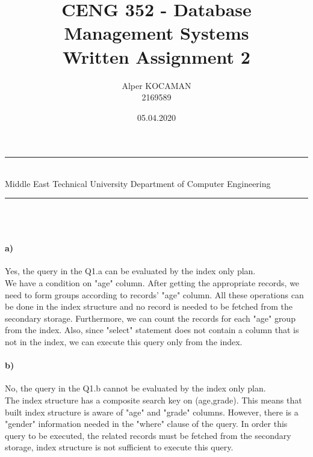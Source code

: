 \documentclass[a4paper,12pt]{article}
\title{CENG 352 - Database Management Systems \\ Written Assignment 2}
\author{Alper KOCAMAN \\ 2169589} %
\date{05.04.2020}
\newcommand{\HRule}{\rule{\linewidth}{1mm}}
\begin{document}
\HRule\\
Middle East Technical University \hfill Department of Computer Engineering
{\let\newpage\relax\maketitle}
\HRule\\
\vspace{1cm}


\section{ \hfill}

\paragraph{a)} Yes, the query in the Q1.a can be evaluated by the index only plan. \\ We have a condition on "age" column. After getting the appropriate records, we need to form groups according to records' "age" column. All these operations can be done in the index structure and no record is needed to be fetched from the secondary storage. Furthermore, we can count the records for each "age" group from the index. Also, since "select" statement does not contain a column that is not in the index, we can execute this query only from the index.\\  

\paragraph{b)} No, the query in the Q1.b cannot be evaluated by the index only plan. \\ The index structure has a composite search key on (age,grade). This means that built index structure is aware of "age" and "grade" columns. However, there is a "gender" information needed in the "where" clause of the query. In order this query to be executed, the related records must be fetched from the secondary storage, index structure is not sufficient to execute this query. 

\newpage

\section{}
\end{document}
